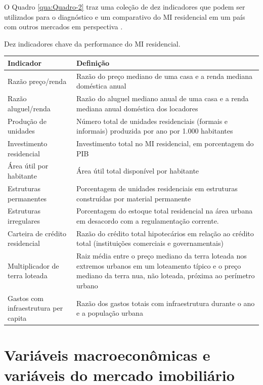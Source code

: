 \documentclass[
	12pt,				%
	oneside,			%
	a4paper,			%
	chapter=TITLE,		%
	section=TITLE,		%
	english,			%
	brazil				%
	]{abntex2}
\begin{document}
O Quadro \ref{qua:Quadro-2} traz uma coleção de dez indicadores que podem
ser utilizados para o diagnóstico e um comparativo do \gls{MI} residencial em
um país com outros mercados em perspectiva \autocite[7]{indicators}.
\begin{quadro}[htb]
    \centering
    \caption{\label{qua:Quadro-2}Dez indicadores chave da performance do \gls{MI} residencial.} 
    \begin{tabular}{|p{5cm}|p{10cm}|}
        \hline
        \textbf{Indicador}        & \textbf{Definição}\\ \hline
         Razão preço/renda        & Razão do preço mediano de uma casa e a renda 
         mediana doméstica anual  \\ \hline
         Razão aluguel/renda      & Razão do aluguel mediano anual de uma casa e a 
         renda mediana anual doméstica dos locadores       \\ \hline
         Produção de unidades     & Número total de unidades residenciais (formais e 
         informais) produzida por ano por 1.000 habitantes       \\ \hline
         Investimento residencial & Investimento total no \gls{MI} residencial, em 
         porcentagem do \gls{PIB}       \\ \hline
         Área útil por habitante  & Área útil total disponível por habitante       \\ \hline
         Estruturas permanentes   & Porcentagem de unidades residenciais em 
         estruturas construídas por material permanente       \\ \hline
         Estruturas irregulares   & Porcentagem do estoque total residencial na área 
         urbana em desacordo com a regulamentação corrente.       \\ \hline
         Carteira de crédito residencial & Razão do crédito total hipotecários em 
         relação ao crédito total (instituições comerciais e governamentais)       \\ \hline
         Multiplicador de terra loteada & Raiz média entre o preço mediano da terra 
         loteada nos extremos urbanos em um loteamento típico e o preço mediano da 
         terra nua, não loteada, próxima ao perímetro urbano       \\ \hline
         Gastos com infraestrutura per capita & Razão dos gastos totais com 
         infraestrutura durante o ano e a população urbana       \\ \hline
    \end{tabular}
\end{quadro}
\hypertarget{variuxe1veis-macroeconuxf4micas-e-variuxe1veis-do-mercado-imobiliuxe1rio}{%
\section{Variáveis macroeconômicas e variáveis do mercado imobiliário}\label{variuxe1veis-macroeconuxf4micas-e-variuxe1veis-do-mercado-imobiliuxe1rio}}
\end{document}
